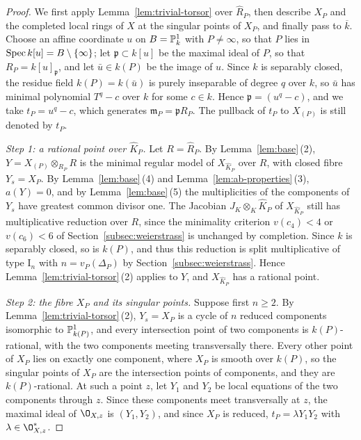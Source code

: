 \begin{proof}
We first apply Lemma~\ref{lem:trivial-torsor} over $\widehat R_P$, then describe $X_P$ and the completed local rings of $X$ at the singular points of $X_P$, and finally pass to $\overline k$.
Choose an affine coordinate $u$ on $B = \mathbb{P}^1_k$ with $P\neq\infty$, so that $P$ lies in $\operatorname{Spec} k[u] = B\setminus\{\infty\}$; let $\mathfrak p\subset k[u]$ be the maximal ideal of $P$, so that $R_P = k[u]_{\mathfrak p}$, and let $\bar u\in k(P)$ be the image of $u$.
Since $k$ is separably closed, the residue field $k(P) = k(\bar u)$ is purely inseparable of degree $q$ over $k$, so $\bar u$ has minimal polynomial $T^q-c$ over $k$ for some $c\in k$.
Hence $\mathfrak p = (u^q-c)$, and we take $t_P = u^q-c$, which generates $\mathfrak m_P = \mathfrak pR_P$.
The pullback of $t_P$ to $X_{(P)}$ is still denoted by $t_P$.

\smallskip
\emph{Step 1: a rational point over $\widehat K_P$.}
Let $R = \widehat R_P$.
By Lemma~\ref{lem:base}\,(2), $Y = X_{(P)}\otimes_{R_P}R$ is the minimal regular model of $X_{\widehat K_P}$ over $R$, with closed fibre $Y_s = X_P$.
By Lemma~\ref{lem:base}\,(4) and Lemma~\ref{lem:ab-properties}\,(3), $a(Y) = 0$, and by Lemma~\ref{lem:base}\,(5) the multiplicities of the components of $Y_s$ have greatest common divisor one.
The Jacobian $J_K\otimes_K\widehat K_P$ of $X_{\widehat K_P}$ still has multiplicative reduction over $R$, since the minimality criterion $v(c_4)<4$ or $v(c_6)<6$ of Section~\ref{subsec:weierstrass} is unchanged by completion.
Since $k$ is separably closed, so is $k(P)$, and thus this reduction is split multiplicative of type $\mathrm I_n$ with $n = v_P(\Delta_P)$ by Section~\ref{subsec:weierstrass}.
Hence Lemma~\ref{lem:trivial-torsor}\,(2) applies to $Y$, and $X_{\widehat K_P}$ has a rational point.

\smallskip
\emph{Step 2: the fibre $X_P$ and its singular points.}
Suppose first $n\geq 2$.
By Lemma~\ref{lem:trivial-torsor}\,(2), $Y_s = X_P$ is a cycle of $n$ reduced components isomorphic to $\mathbb{P}^1_{k(P)}$, and every intersection point of two components is $k(P)$-rational, with the two components meeting transversally there.
Every other point of $X_P$ lies on exactly one component, where $X_P$ is smooth over $k(P)$, so the singular points of $X_P$ are the intersection points of components, and they are $k(P)$-rational.
At such a point $z$, let $Y_1$ and $Y_2$ be local equations of the two components through $z$.
Since these components meet transversally at $z$, the maximal ideal of $\O_{X,z}$ is $(Y_1,Y_2)$, and since $X_P$ is reduced, $t_P = \lambda Y_1Y_2$ with $\lambda\in\O_{X,z}^*$.


\end{proof}
